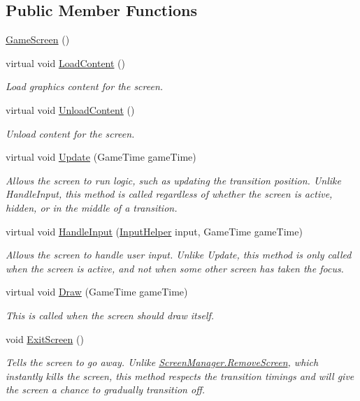 \subsection*{Public Member Functions}
\begin{DoxyCompactItemize}
\item 
\hyperlink{classgearit_1_1xna_1_1_game_screen_a14b40b29f80b5c520766afa5aaa96c4c}{Game\+Screen} ()
\item 
virtual void \hyperlink{classgearit_1_1xna_1_1_game_screen_a7b4299ca1406c8d4ffcd2e479e83bef5}{Load\+Content} ()
\begin{DoxyCompactList}\small\item\em Load graphics content for the screen. \end{DoxyCompactList}\item 
virtual void \hyperlink{classgearit_1_1xna_1_1_game_screen_a5d51da08229da3cb5c561550df7a6c8c}{Unload\+Content} ()
\begin{DoxyCompactList}\small\item\em Unload content for the screen. \end{DoxyCompactList}\item 
virtual void \hyperlink{classgearit_1_1xna_1_1_game_screen_a6bb803502dfbd62b275c2a21d182f88e}{Update} (Game\+Time game\+Time)
\begin{DoxyCompactList}\small\item\em Allows the screen to run logic, such as updating the transition position. Unlike Handle\+Input, this method is called regardless of whether the screen is active, hidden, or in the middle of a transition. \end{DoxyCompactList}\item 
virtual void \hyperlink{classgearit_1_1xna_1_1_game_screen_acbe1128afbf42535ad33ce7423b2e959}{Handle\+Input} (\hyperlink{classgearit_1_1xna_1_1_input_helper}{Input\+Helper} input, Game\+Time game\+Time)
\begin{DoxyCompactList}\small\item\em Allows the screen to handle user input. Unlike Update, this method is only called when the screen is active, and not when some other screen has taken the focus. \end{DoxyCompactList}\item 
virtual void \hyperlink{classgearit_1_1xna_1_1_game_screen_a9f284010229016b5564519484775a9ec}{Draw} (Game\+Time game\+Time)
\begin{DoxyCompactList}\small\item\em This is called when the screen should draw itself. \end{DoxyCompactList}\item 
void \hyperlink{classgearit_1_1xna_1_1_game_screen_ac0a09358bf75830432169413f4d1ae36}{Exit\+Screen} ()
\begin{DoxyCompactList}\small\item\em Tells the screen to go away. Unlike \hyperlink{classgearit_1_1xna_1_1_screen_manager_a0980799f0c3f3667e118674fbfea1e6e}{Screen\+Manager.\+Remove\+Screen}, which instantly kills the screen, this method respects the transition timings and will give the screen a chance to gradually transition off. \end{DoxyCompactList}\end{DoxyCompactItemize}
